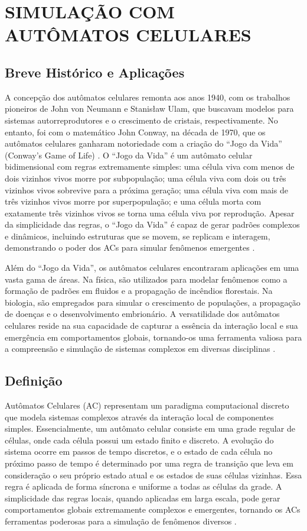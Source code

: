 \documentclass[12pt,oneside]{report}
\begin{document}
\section{SIMULAÇÃO COM AUTÔMATOS CELULARES}

\subsection{Breve Histórico e Aplicações}

A concepção dos autômatos celulares remonta aos anos 1940, com os trabalhos pioneiros de John von Neumann e Stanisław Ulam, que buscavam modelos para sistemas autorreprodutores e o crescimento de cristais, respectivamente. No entanto, foi com o matemático John Conway, na década de 1970, que os autômatos celulares ganharam notoriedade com a criação do ``Jogo da Vida'' (Conway's Game of Life) \cite{Gardner1970}. O ``Jogo da Vida'' é um autômato celular bidimensional com regras extremamente simples: uma célula viva com menos de dois vizinhos vivos morre por subpopulação; uma célula viva com dois ou três vizinhos vivos sobrevive para a próxima geração; uma célula viva com mais de três vizinhos vivos morre por superpopulação; e uma célula morta com exatamente três vizinhos vivos se torna uma célula viva por reprodução. Apesar da simplicidade das regras, o ``Jogo da Vida'' é capaz de gerar padrões complexos e dinâmicos, incluindo estruturas que se movem, se replicam e interagem, demonstrando o poder dos ACs para simular fenômenos emergentes \cite{Gardner1970}.

Além do ``Jogo da Vida'', os autômatos celulares encontraram aplicações em uma vasta gama de áreas. Na física, são utilizados para modelar fenômenos como a formação de padrões em fluidos e a propagação de incêndios florestais. Na biologia, são empregados para simular o crescimento de populações, a propagação de doenças e o desenvolvimento embrionário. A versatilidade dos autômatos celulares reside na sua capacidade de capturar a essência da interação local e sua emergência em comportamentos globais, tornando-os uma ferramenta valiosa para a compreensão e simulação de sistemas complexos em diversas disciplinas \cite{kier2005}.

\subsection{Definição}

Autômatos Celulares (AC) representam um paradigma computacional discreto que modela sistemas complexos através da interação local de componentes simples. Essencialmente, um autômato celular consiste em uma grade regular de células, onde cada célula possui um estado finito e discreto. A evolução do sistema ocorre em passos de tempo discretos, e o estado de cada célula no próximo passo de tempo é determinado por uma regra de transição que leva em consideração o seu próprio estado atual e os estados de suas células vizinhas. Essa regra é aplicada de forma síncrona e uniforme a todas as células da grade. A simplicidade das regras locais, quando aplicadas em larga escala, pode gerar comportamentos globais extremamente complexos e emergentes, tornando os ACs ferramentas poderosas para a simulação de fenômenos diversos \cite{kier2005}.
\end{document}
